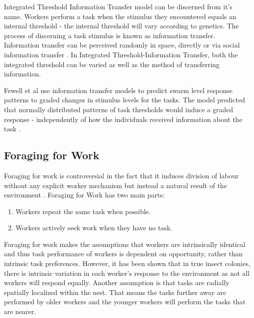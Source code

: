 Integrated Threshold Information Transfer model can be discerned from it's name. Workers perform a task when the stimulus they encountered equals an internal threshold - the internal threshold will vary according to genetics. The process of discerning a task stimulus is known as information transfer. Information transfer can be perceived randomly in space, directly or via social information transfer  \cite{fewell1999division}. In Integrated Threshold-Information Transfer, both the integrated threshold can be varied as well as the method of transferring information.

Fewell et al  use information transfer models to predict swarm level response patterns to graded changes in stimulus levels for the tasks. The model predicted that normally distributed patterns of task thresholds would induce a graded response - independently of how the individuals received information about the task \cite{fewell1999division}.


\subsection{Foraging for Work}

Foraging for work is controversial in the fact that it induces division of labour without any explicit worker mechanism but instead a natural result of the environment \cite{beshers2001models}.  
Foraging for Work has two main parts:
\begin{enumerate}
	\item Workers repeat the same task when possible.
	\item Workers actively seek work when they have no task.
\end{enumerate}


Foraging for work makes the assumptions that workers are intrinsically identical and thus task performance of workers is dependent on opportunity, rather than intrinsic task preferences. However, it has been shown that in true insect colonies, there is intrinsic variation in each worker's response to the environment as not all workers will respond equally. Another assumption is that tasks are radially spatially localized within the nest. That means the tasks further away are performed by older workers and the younger workers will perform the tasks that are nearer.

